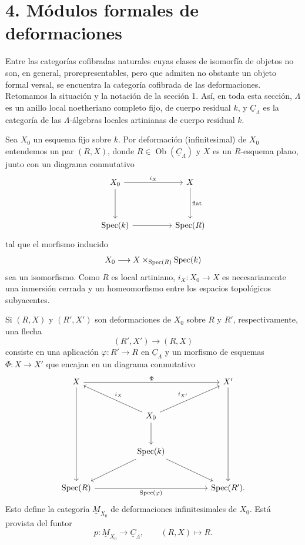 
\section*{4. Módulos formales de deformaciones}

Entre las categorías cofibradas naturales cuyas clases de isomorfía
de objetos no son, en general, prorepresentables, pero que admiten no
obstante un objeto formal versal, se encuentra la categoría cofibrada
de las deformaciones. Retomamos la situación y la notación de la
sección 1. Así, en toda esta sección, $\Lambda$ es un anillo local
noetheriano completo fijo, de cuerpo residual $k$, y
$\underline C_\Lambda$ es la categoría de las $\Lambda$-álgebras
locales artinianas de cuerpo residual $k$.

Sea $X_0$ un esquema fijo sobre $k$. Por deformación (infinitesimal)
de $X_0$ entendemos un par $(R,X)$, donde
$R\in\operatorname{Ob}(\underline C_\Lambda)$ y $X$ es un
$R$-esquema plano, junto con un diagrama conmutativo
\[
\begin{tikzcd}[column sep=huge,row sep=huge]
X_0 \arrow[r,"i_X"] \arrow[d] & X \arrow[d,"\mathrm{flat}"] \\
\operatorname{Spec}(k) \arrow[r] & \operatorname{Spec}(R)
\end{tikzcd}
\]
tal que el morfismo inducido
\[
 X_0\longrightarrow
 X\times_{\sisi{\operatorname{spec}(R)}{\operatorname{Spec}(R)}}\operatorname{Spec}(k)
\]
sea un isomorfismo. Como $R$ es local artiniano,
$i_X:X_0\longrightarrow X$ es necesariamente una inmersión cerrada y
un homeomorfismo entre los espacios topológicos subyacentes.


Si $(R,X)$ y $(R',X')$ son deformaciones de $X_0$ sobre $R$ y
$R'$, respectivamente, una flecha
\[
 (R',X')\longrightarrow(R,X)
\]
consiste en una aplicación $\varphi:R'\longrightarrow R$ en
$\underline C_\Lambda$ y un morfismo de esquemas
$\Phi:X\longrightarrow X'$ que encajan en un diagrama conmutativo
\[
\begin{tikzcd}[column sep=huge,row sep=large]
X \arrow[rr,"\Phi"] \arrow[ddd] && X' \arrow[ddd] \\
& X_0 \arrow[ul,"i_X"'] \arrow[ur,"i_{X'}"] \arrow[d] & \\
& \operatorname{Spec}(k) \arrow[dl] \arrow[dr] & \\
\operatorname{Spec}(R)
 \arrow[rr,"\operatorname{Spec}(\varphi)"']
&& \operatorname{Spec}(R').
\end{tikzcd}
\]
Esto define la categoría $\underline M_{X_0}$ de deformaciones
infinitesimales de $X_0$. Está provista del funtor
\[
 p:\underline M_{X_0}\longrightarrow\underline C_\Lambda,
 \qquad (R,X)\longmapsto R.
\]

